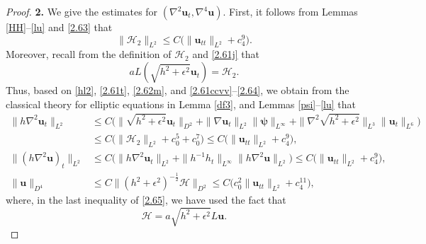 \documentclass[11pt,reqno]{amsart}
\numberwithin{rk}{section}
\numberwithin{prop}{section}
\numberwithin{mydef}{section}
\numberwithin{lem}{section}
\numberwithin{equation}{section}
\numberwithin{thm}{section}
\begin{document}
\begin{proof}
\smallskip
\textbf{2.} We give the estimates for $(\nabla^2\boldsymbol{u}_t,\nabla^4 \boldsymbol{u})$. First, it follows from Lemmas \ref{HH}--\ref{lu} and \eqref{2.63} that 
\begin{equation}\label{2.61ccvv}
\|\mathcal{H}_2\|_{L^2}\leq  C\big(\|\boldsymbol{u}_{tt}\|_{L^2}+c_4^{9}\big).
\end{equation}
Moreover, recall from the definition of $\mathcal{H}_2$ and \eqref{2.61j} that 
\begin{equation}\label{2.64}
aL(\sqrt{h^2+\epsilon^2}\boldsymbol{u}_t)=\mathcal{H}_2.
\end{equation}
Thus, based on  \eqref{hl2},  \eqref{2.61t}, \eqref{2.62m}, 
and \eqref{2.61ccvv}--\eqref{2.64}, 
we obtain from the classical theory for elliptic equations in Lemma \ref{df3}, and  Lemmas \ref{psi}--\ref{lu} that
\begin{equation}\label{2.65}\begin{aligned}
\displaystyle
\|h\nabla^2\boldsymbol{u}_t\|_{L^2}&\leq C\big(\|\sqrt{h^2+\epsilon^2}\boldsymbol{u}_t\|_{D^2}+\|\nabla \boldsymbol{u}_t\|_{L^2}\|\boldsymbol{\psi}\|_{L^\infty}+\|\nabla^2\sqrt{h^2+\epsilon^2}\|_{L^3}\|\boldsymbol{u}_t\|_{L^6}\big)\\
&\displaystyle
\leq  C\big(\|\mathcal{H}_2\|_{L^2}+c_0^5+c_0^7\big)\leq C\big(\|\boldsymbol{u}_{tt}\|_{L^2}+c_4^{9}\big),\\[2pt]
\displaystyle
\|(h\nabla^2\boldsymbol{u})_t\|_{L^2}&\leq C\big(\|h\nabla^2\boldsymbol{u}_t\|_{L^2}+\|h^{-1}h_t\|_{L^\infty}\|h\nabla^2 \boldsymbol{u}\|_{L^2}\big)
\leq  C\big(\|\boldsymbol{u}_{tt}\|_{L^2}+c_4^{9}\big),\\[2pt]
\displaystyle
\|\boldsymbol{u}\|_{D^4}&\leq C\|(h^2+\epsilon^2)^{-\frac{1}{2}}\mathcal{H}\|_{D^2}
\leq  C\big(c^2_0\|\boldsymbol{u}_{tt}\|_{L^2}+c_4^{11}\big),
\end{aligned}
\end{equation}
where, in the last inequality of \eqref{2.65}, we have used the fact that
\begin{equation}\label{H=Lu}
\mathcal{H}=a\sqrt{h^2+\epsilon^2}L\boldsymbol{u}.
\end{equation}


\end{proof}
\end{document}
